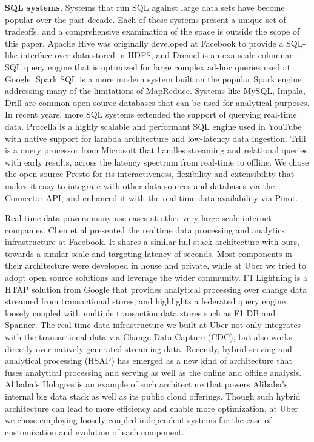 \documentclass[sigconf]{acmart}
\begin{document}
{\bfseries SQL systems.} Systems that run SQL against large data sets have become popular over the past decade. Each of these systems present a unique set of tradeoffs, and a comprehensive examination of the space is outside the scope of this paper. Apache Hive\cite{hive} was originally developed at Facebook to provide a SQL-like interface over data stored in HDFS\cite{hdfs}, and Dremel\cite{melnik2020dremel} is an exa-scale columnar SQL query engine that is optimized for large complex ad-hoc queries used at Google. Spark SQL\cite{armbrust2015spark} is a more modern system built on the popular Spark engine addressing many of the limitations of MapReduce\cite{dean2008mapreduce}. Systems like MySQL\cite{mysql}, Impala\cite{impala}, Drill\cite{drill} are common open source databases that can be used for analytical purposes. In recent years, more SQL systems extended the support of querying real-time data. Procella\cite{chattopadhyay2019procella} is a highly scalable and performant SQL engine used in YouTube with native support for lambda architecture and low-latency data ingestion. Trill\cite{chandramouli2014trill} is a query processor from Microsoft that handles streaming and relational queries with early results, across the latency spectrum from real-time to offline. We chose the open source Presto for its interactiveness, flexibility and extensibility that makes it easy to integrate with other data sources and databases via the Connector API, and enhanced it with the real-time data availability via Pinot.

Real-time data powers many use cases at other very large scale internet companies. Chen et al\cite{chen2016realtime} presented the realtime data processing and analytics infrastructure at Facebook. It shares a similar full-stack architecture with ours, towards a similar scale and targeting latency of seconds. Most components in their architecture were developed in house and private, while at Uber we tried to adopt open source solutions and leverage the wider community. F1 Lightning\cite{yang2020f1} is a HTAP solution from Google that provides analytical processing over change data streamed from transactional stores, and highlights a federated query engine loosely coupled with multiple transaction data stores such as F1 DB\cite{shute2012f1} and Spanner\cite{corbett2013spanner}. The real-time data infrastructure we built at Uber not only integrates with the transactional data via Change Data Capture (CDC), but also works directly over natively generated streaming data. Recently, hybrid serving and analytical processing (HSAP) has emerged as a new kind of architecture that fuses analytical processing and serving as well as the online and offline analysis. Alibaba’s Hologres\cite{jiang2020alibaba} is an example of such architecture that powers Alibaba’s internal big data stack as well as its public cloud offerings. Though such hybrid architecture can lead to more efficiency and enable more optimization, at Uber we chose employing loosely coupled independent systems for the ease of customization and evolution of each component.
\end{document}
